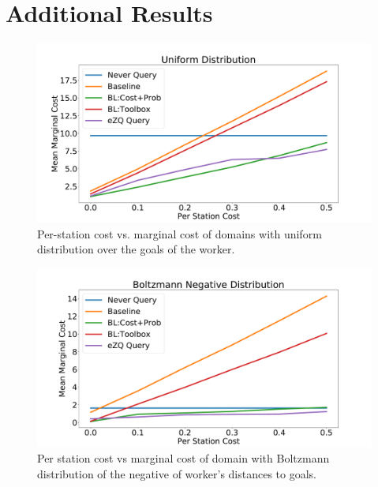 \documentclass[letterpaper]{article}
\begin{document}
\section{Additional Results}
\label{app:res}

\begin{figure}
    \centering
    \includegraphics[width=\linewidth]{Figures/CAT_COOPAI_Uniform.pdf}
    \caption{Per-station cost vs. marginal cost of domains with uniform distribution over the goals of the worker.}
    \label{fig:uniform}
\end{figure}

\begin{figure}
    \centering
    \includegraphics[width=\linewidth]{Figures/CAT_COOPAI_BoltzmannNegative.pdf}
    \caption{Per station cost vs marginal cost of domain with Boltzmann distribution of the negative of worker's distances to goals.}
    \label{fig:inv_dist}
\end{figure}
\end{document}
